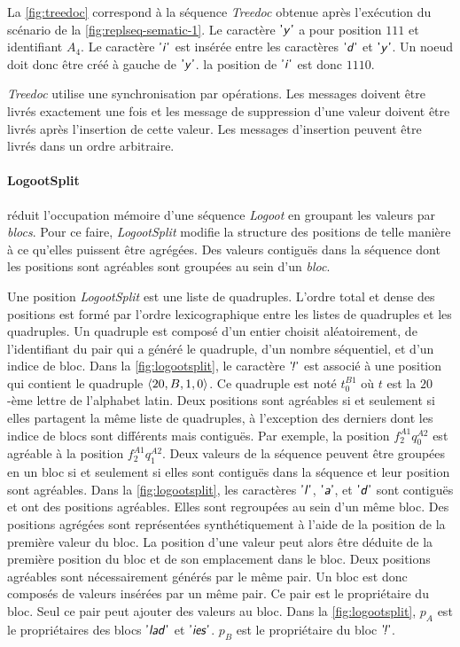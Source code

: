 La \autoref{fig:treedoc} correspond à la séquence \emph{Treedoc} obtenue après l'exécution du scénario de la \autoref{fig:replseq-sematic-1}.
Le caractère $\textsf{'\textit{y}'}$ a pour position $111$ et identifiant $A_4$.
Le caractère $\textsf{'\textit{i}'}$ est insérée entre les caractères $\textsf{'\textit{d}'}$ et $\textsf{'\textit{y}'}$.
Un noeud doit donc être créé à gauche de $\textsf{'\textit{y}'}$.
la position de $\textsf{'\textit{i}'}$ est donc $1110$.

\emph{Treedoc} utilise une synchronisation par opérations.
Les messages doivent être livrés exactement une fois et les message de suppression d'une valeur doivent être livrés après l'insertion de cette valeur.
Les messages d'insertion peuvent être livrés dans un ordre arbitraire.


\paragraph{LogootSplit}\autocite{andre_2013_logootsplit} réduit l'occupation mémoire d'une séquence \emph{Logoot} en groupant les valeurs par \emph{blocs}.
Pour ce faire, \emph{LogootSplit} modifie la structure des positions de telle manière à ce qu'elles puissent être agrégées.
Des valeurs contiguës dans la séquence dont les positions sont agréables sont groupées au sein d'un \emph{bloc}.

Une position \emph{LogootSplit} est une liste de quadruples.
L'ordre total et dense des positions est formé par l'ordre lexicographique entre les listes de quadruples et les quadruples.
Un quadruple est composé d'un entier choisit aléatoirement, de l'identifiant du pair qui a généré le quadruple, d'un nombre séquentiel, et d'un indice de bloc.
Dans la \autoref{fig:logootsplit}, le caractère $\textsf{'\textit{\negthinspace!}'}$ est associé à une position qui contient le quadruple $\langle20, B, 1, 0\rangle$.
Ce quadruple est noté $t^{B1}_0$ où $t$ est la $20$-ème lettre de l'alphabet latin.
Deux positions sont agréables si et seulement si elles partagent la même liste de quadruples, à l'exception des derniers dont les indice de blocs sont différents mais contiguës.
Par exemple, la position $f^{A1}_2q^{A2}_0$ est agréable à la position $f^{A1}_2q^{A2}_1$.
Deux valeurs de la séquence peuvent être groupées en un bloc si et seulement si elles sont contiguës dans la séquence et leur position sont agréables.
Dans la \autoref{fig:logootsplit}, les caractères $\textsf{'\textit{l}'}$, $\textsf{'\textit{a}'}$, et $\textsf{'\textit{d}'}$ sont contiguës et ont des positions agréables.
Elles sont regroupées au sein d'un même bloc.
Des positions agrégées sont représentées synthétiquement à l'aide de la position de la première valeur du bloc.
La position d'une valeur peut alors être déduite de la première position du bloc et de son emplacement dans le bloc.
Deux positions agréables sont nécessairement générés par le même pair.
Un bloc est donc composés de valeurs insérées par un même pair.
Ce pair est le propriétaire du bloc.
Seul ce pair peut ajouter des valeurs au bloc.
Dans la \autoref{fig:logootsplit}, $p_A$ est le propriétaires des blocs $\textsf{'\textit{lad}'}$ et $\textsf{'\textit{ies}'}$.
$p_B$ est le propriétaire du bloc $\textsf{'\textit{\negthinspace!}'}$.

